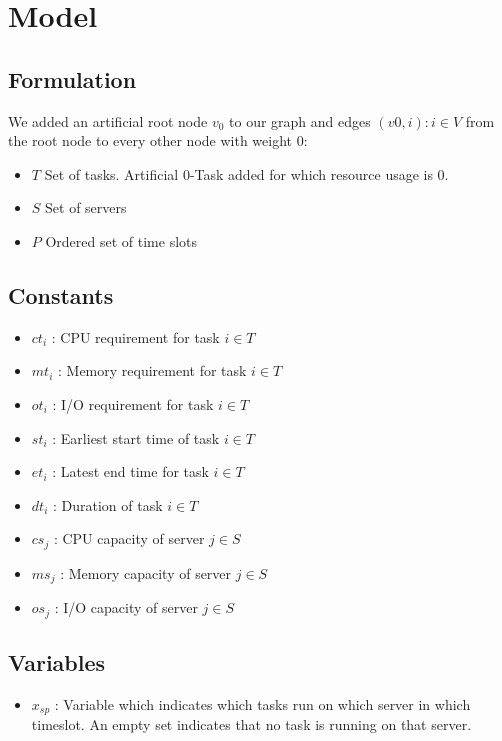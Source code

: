 \section{Model}

\subsection{Formulation}

We added an artificial root node $v_0$ to our graph and edges $(v0,i) : i \in V$  from the root node to every other node with weight $0$:

\begin{itemize}
	\item $T$ Set of tasks. Artificial 0-Task added for which resource usage is 0.
	\item $S$ Set of servers
	\item $P$ Ordered set of time slots
\end{itemize}
\subsection{Constants}

\begin{itemize}
	\item $ct_{i}$ : CPU requirement for task $i \in T$ 
	\item $mt_{i}$ : Memory requirement for task $i \in T$ 
	\item $ot_{i}$ : I/O requirement for task $i \in T$
	\item $st_{i}$ : Earliest start time of task $i \in T$
	\item $et_{i}$ : Latest end time for task $i \in T$
	\item $dt_{i}$ : Duration of task $i \in T$
	
	\item $cs_{j}$ : CPU capacity of server $j \in S$
	\item $ms_{j}$ : Memory capacity of server $j \in S$
	\item $os_{j}$ : I/O capacity of server $j \in S$
\end{itemize}

\subsection{Variables}

\begin{itemize}
	\item $x_{sp}$ : Variable which indicates which tasks run on which server in which timeslot. An empty set indicates that no task is running on that server.
\end{itemize}

